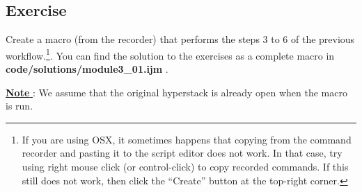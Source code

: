 
\subsection{Exercise }
Create a macro (from the recorder) that performs the steps 3 to 6 of the previous workflow.\footnote{If you are using OSX, it sometimes happens that copying from the command recorder and pasting it to the script editor does not work. In that case, try using right mouse click (or control-click) to copy recorded commands. If this still does not work, then click the ``Create'' button at the top-right corner.}. You can find the solution to the exercises as a complete macro in \textbf{code/solutions/module3\_01.ijm} .

\underline{\textbf{Note} }: We assume that the original hyperstack is already open when the macro is run.